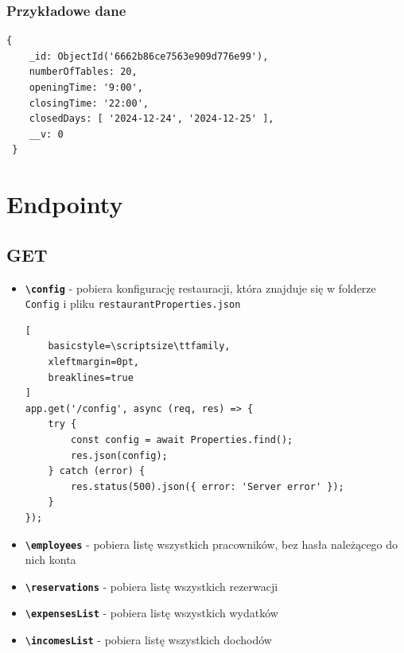 \documentclass[12pt]{article}
\begin{document}
\subsubsection{Przykładowe dane}
\begin{lstlisting}[]
 {
    _id: ObjectId('6662b86ce7563e909d776e99'),
    numberOfTables: 20,
    openingTime: '9:00',
    closingTime: '22:00',
    closedDays: [ '2024-12-24', '2024-12-25' ],
    __v: 0
 }
\end{lstlisting}

\newpage
\section{Endpointy}
\subsection{GET}
\begin{itemize}
    \item \textbf{\texttt{\textbackslash config}} - pobiera konfigurację restauracji, która znajduje się w folderze \texttt{Config} i pliku \texttt{restaurantProperties.json}
    \begin{lstlisting}[
    basicstyle=\scriptsize\ttfamily,
    xleftmargin=0pt,
    breaklines=true
]
app.get('/config', async (req, res) => {
    try {
        const config = await Properties.find();
        res.json(config);
    } catch (error) {
        res.status(500).json({ error: 'Server error' });
    }
});
\end{lstlisting}
    \item \textbf{\texttt{\textbackslash employees}} - pobiera listę wszystkich pracowników, bez hasła należącego do nich konta
    \item \textbf{\texttt{\textbackslash reservations}} - pobiera listę wszystkich rezerwacji
    \item \textbf{\texttt{\textbackslash expensesList}} - pobiera listę wszystkich wydatków
    \item \textbf{\texttt{\textbackslash incomesList}} - pobiera listę wszystkich dochodów
\end{itemize}
\end{document}
